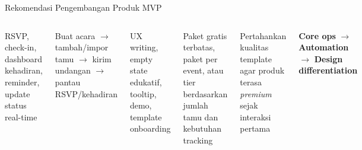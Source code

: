 \documentclass[aspectratio=169]{beamer}
\begin{document}
\begin{frame}{Rekomendasi Pengembangan Produk MVP}
  \begin{columns}[T]
      \begin{tcolorbox}[statbox,title={\quad 1. Core: Tracking Tamu}]
        \tiny RSVP, check-in, dashboard kehadiran, reminder, update status real-time
      \end{tcolorbox}
      \vspace{0.15cm}
      \begin{tcolorbox}[statbox,title={\quad 2. Sederhanakan Alur}]
        \tiny Buat acara $\to$ tambah/impor tamu $\to$ kirim undangan $\to$ pantau RSVP/kehadiran
      \end{tcolorbox}
      \vspace{0.15cm}
      \begin{tcolorbox}[statbox,title={\quad 3. Onboarding \& Kejelasan}]
        \tiny UX writing, empty state edukatif, tooltip, demo, template onboarding
      \end{tcolorbox}
      \begin{tcolorbox}[insightbox,title={\quad 4. Strategi Harga}]
        \tiny Paket gratis terbatas, paket per event, atau tier berdasarkan jumlah tamu dan kebutuhan tracking
      \end{tcolorbox}
      \vspace{0.15cm}
      \begin{tcolorbox}[insightbox,title={\quad 5. Visual sebagai Diferensiasi}]
        \tiny Pertahankan kualitas template agar produk terasa \textit{premium} sejak interaksi pertama
      \end{tcolorbox}
      \vspace{0.15cm}
      \begin{tcolorbox}[implbox,title={\quad Prioritas Roadmap}]
        \tiny \textbf{Core ops} $\to$ \textbf{Automation} $\to$ \textbf{Design differentiation}
      \end{tcolorbox}
  \end{columns}
\end{frame}
\end{document}
